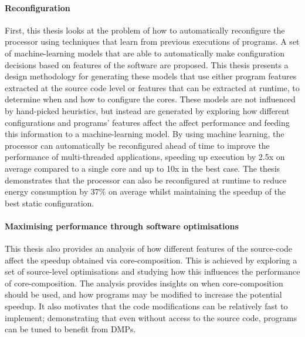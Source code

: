 \paragraph*{Reconfiguration}
First, this thesis looks at the problem of how to automatically reconfigure the processor using techniques that learn from previous executions of programs.
A set of machine-learning models that are able to automatically make configuration decisions based on features of the software are proposed.
This thesis presents a design methodology for generating these models that use either program features extracted at the source code level or features that can be extracted at runtime, to determine when and how to configure the cores.
These models are not influenced by hand-picked heuristics, but instead are generated by exploring how different configurations and programs' features affect the affect performance and feeding this information to a machine-learning model.
By using machine learning, the processor can automatically be reconfigured ahead of time to improve the performance of multi-threaded applications, speeding up execution by 2.5x on average compared to a single core and up to 10x in the best case.
The thesis demonstrates that the processor can also be reconfigured at runtime to reduce energy consumption by 37\% on average whilst maintaining the speedup of the best static configuration.
\vspace{-1em}
\paragraph*{Maximising performance through software optimisations}
This thesis also provides an analysis of how different features of the source-code affect the speedup obtained via core-composition.
This is achieved by exploring a set of source-level optimisations and studying how this influences the performance of core-composition.
The analysis provides insights on when core-composition should be used, and how programs may be modified to increase the potential speedup.
It also motivates that the code modifications can be relatively  fast to implement; demonstrating that even without access to the source code, programs can be tuned to benefit from DMPs.
\vspace{-1em}
